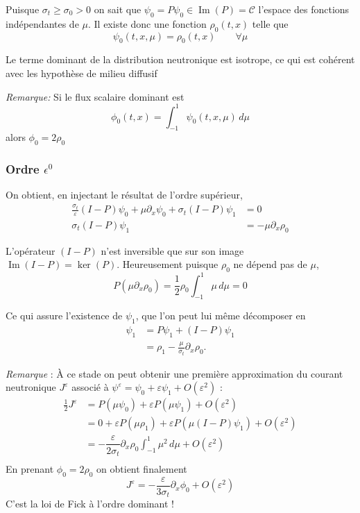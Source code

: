 \documentclass{article}
\begin{document}
Puisque \(\sigma_t \ge \sigma_0 >0\) on sait que \(\psi_0 = P\psi_0 \in \operatorname{Im}(P) = \mathcal{C}\) l'espace des fonctions indépendantes de \(\mu\). Il existe donc une fonction \(\rho_0(t,x)\) telle que 
\begin{equation}
    \psi_0(t,x,\mu) = \rho_0(t,x) \qquad \forall \mu
\end{equation}

Le terme dominant de la distribution neutronique est isotrope, ce qui est cohérent avec les hypothèse de milieu diffusif 

\textit{Remarque:} Si le flux scalaire dominant est 
\[
\phi_0(t,x) = \int_{-1}^1 \psi_0(t,x,\mu)\,d\mu
\]
alors \(\phi_0 = 2\rho_0\)

\subsubsection{Ordre $\epsilon^0$} 
On obtient, en injectant le résultat de l'ordre supérieur,
\begin{align*}
    \frac{\sigma_t}{\varepsilon}(I-P)\psi_0 + \mu\partial_x\psi_0 + \sigma_t(I-P)\psi_1 &= 0 \\
    \sigma_t(I-P)\psi_1 &= -\mu\partial_x\rho_0 
\end{align*}

L'opérateur \((I-P)\) n'est inversible que sur son image \(\operatorname{Im}(I-P) = \ker(P)\). Heureusement puisque \(\rho_0\) ne dépend pas de \(\mu\), 
\[ P( \mu\partial_x\rho_0) = \frac12\rho_0\int_{-1}^1\mu\,d\mu = 0\]

Ce qui assure l'existence de \(\psi_1\), que l'on peut lui même décomposer en 
\begin{align*}
    \psi_1 &= P\psi_1 + (I-P)\psi_1\\
    &= \rho_1 - \frac{\mu}{\sigma_t}\partial_x\rho_0.
\end{align*}

\textit{Remarque} : À ce stade on peut obtenir une première approximation du courant neutronique \(J^{\varepsilon}\) associé à \(\psi^{\varepsilon} = \psi_0 + \varepsilon\psi_1 + O(\varepsilon^2)\) :
\begin{align*}
    \frac12 J^{\varepsilon} &= P(\mu\psi_0) + \varepsilon P(\mu\psi_1) + O(\varepsilon^2) \\
    &= 0 + \varepsilon P(\mu\rho_1) + \varepsilon P(\mu(I-P)\psi_1) +  O(\varepsilon^2) \\
    &= -\dfrac{\varepsilon}{2\sigma_t}\partial_x\rho_0 \int_{-1}^1 \mu^2\,d\mu+  O(\varepsilon^2)\\
\end{align*}
En prenant \(\phi_0 = 2\rho_0\) on obtient finalement 
\[J^{\varepsilon} = -\dfrac{\varepsilon}{3\sigma_t}\partial_x\phi_0 +  O(\varepsilon^2) \]
C'est la loi de Fick à l'ordre dominant !
\end{document}

